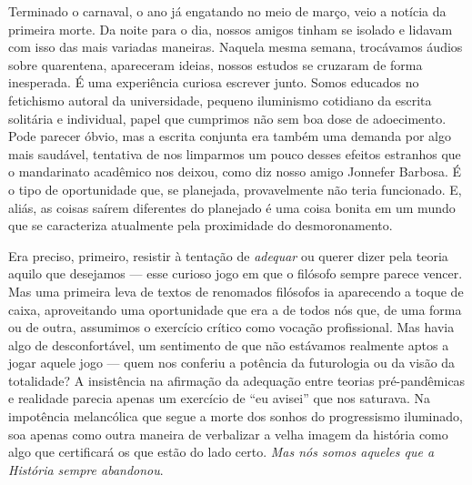 Terminado o carnaval, o ano já engatando no meio de março, veio a
notícia da primeira morte. Da noite para o dia, nossos amigos tinham se
isolado e lidavam com isso das mais variadas maneiras. Naquela mesma
semana, trocávamos áudios sobre quarentena, apareceram ideias, nossos
estudos se cruzaram de forma inesperada. É uma experiência curiosa
escrever junto. Somos educados no fetichismo autoral da universidade,
pequeno iluminismo cotidiano da escrita solitária e individual, papel
que cumprimos não sem boa dose de adoecimento. Pode parecer óbvio, mas a
escrita conjunta era também uma demanda por algo mais saudável,
tentativa de nos limparmos um pouco desses efeitos estranhos que o
mandarinato acadêmico nos deixou, como diz nosso amigo Jonnefer Barbosa.
É o tipo de oportunidade que, se planejada, provavelmente não teria
funcionado. E, aliás, as coisas saírem diferentes do planejado é uma
coisa bonita em um mundo que se caracteriza atualmente pela proximidade
do desmoronamento.~

Era preciso, primeiro, resistir à tentação de \emph{adequar} ou querer
dizer pela teoria aquilo que desejamos --- esse curioso jogo em que o
filósofo sempre parece vencer. Mas uma primeira leva de textos de
renomados filósofos ia aparecendo a toque de caixa, aproveitando uma
oportunidade que era a de todos nós que, de uma forma ou de outra,
assumimos o exercício crítico como vocação profissional. Mas havia algo
de desconfortável, um sentimento de que não estávamos realmente aptos a
jogar aquele jogo --- quem nos conferiu a potência da futurologia ou da
visão da totalidade? A insistência na afirmação da adequação entre
teorias pré-pandêmicas e realidade parecia apenas um exercício de ``eu
avisei'' que nos saturava. Na impotência melancólica que segue a morte
dos sonhos do progressismo iluminado, soa apenas como outra maneira de
verbalizar a velha imagem da história como algo que certificará os que
estão do lado certo. \emph{Mas nós somos aqueles que a História sempre
abandonou}.

